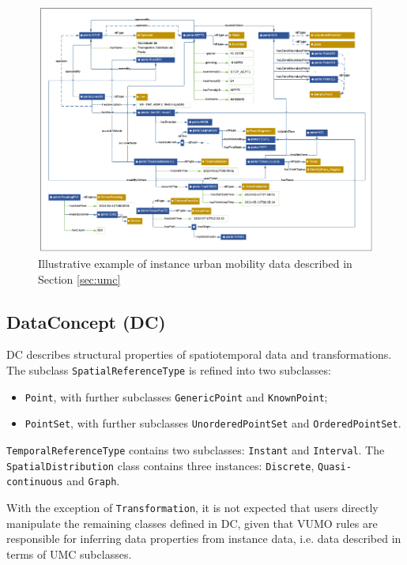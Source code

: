 \documentclass[]{interact}
\theoremstyle{plain}%
\theoremstyle{definition}
\theoremstyle{remark}
\theoremstyle{definition}
\begin{document}
\begin{figure}
	\centering
	\includegraphics[width=1\linewidth]{images/vumo_rdfgraph}
	\caption{Illustrative example of instance urban mobility data described in Section \ref{sec:umc}}
	\label{fig:rdfgraph}
\end{figure}




\subsection{DataConcept (DC)}
\label{sec:dc}

DC describes structural properties of spatiotemporal data and transformations. The subclass \texttt{SpatialReferenceType} is refined into two subclasses:

\begin{itemize}
 \item \texttt{Point}, with further subclasses \texttt{GenericPoint} and \texttt{KnownPoint};
 \item \texttt{PointSet}, with further subclasses \texttt{UnorderedPointSet} and \texttt{OrderedPointSet}.
\end{itemize}

 \texttt{TemporalReferenceType} contains two subclasses: \texttt{Instant} and \texttt{Interval}. The \texttt{Spatial\-Dis\-trib\-ution} class contains three instances: \texttt{Discrete}, \texttt{Quasi-continuous} and \texttt{Graph}.

With the exception of \texttt{Transformation}, it is not expected that users directly manipulate the remaining classes defined in DC, given that VUMO rules are responsible for inferring data properties from instance data, i.e. data described in terms of UMC subclasses.
\end{document}
